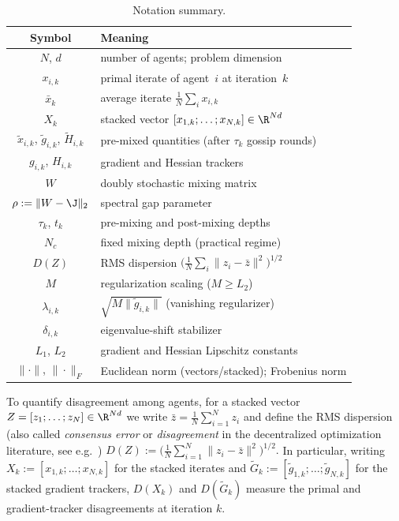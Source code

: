 \documentclass[review,onefignum,onetabnum]{siamart171218}
\begin{document}
	\begin{table}[htbp]
		\centering
		\caption{Notation summary.}
		\label{tab:notation}
		\setlength{\tabcolsep}{4pt}
		\small
		\begin{tabular}{cl}
			\toprule
			Symbol & Meaning \\
			\midrule
			$N$, $d$ & number of agents; problem dimension \\
			$x_{i,k}$ & primal iterate of agent~$i$ at iteration~$k$ \\
			$\bar x_k$ & average iterate $\frac1N\sum_i x_{i,k}$ \\
			$X_k$ & stacked vector $[x_{1,k};\dots;x_{N,k}]\in\R^{Nd}$ \\
			$\tilde x_{i,k}$, $\tilde g_{i,k}$, $\tilde H_{i,k}$ & pre-mixed quantities (after $\tau_k$ gossip rounds) \\
			$g_{i,k}$, $H_{i,k}$ & gradient and Hessian trackers \\
			$W$ & doubly stochastic mixing matrix \\
			$\rho:=\|W-\J\|_2$ & spectral gap parameter \\
			$\tau_k$, $t_k$ & pre-mixing and post-mixing depths \\
			$N_c$ & fixed mixing depth (practical regime) \\
			$D(Z)$ & RMS dispersion $\bigl(\frac1N\sum_i\|z_i-\bar z\|^2\bigr)^{1/2}$ \\
			$M$ & regularization scaling ($M\ge L_2$) \\
			$\lambda_{i,k}$ & $\sqrt{M\|\tilde g_{i,k}\|}$ (vanishing regularizer) \\
			$\delta_{i,k}$ & eigenvalue-shift stabilizer \\
			$L_1$, $L_2$ & gradient and Hessian Lipschitz constants \\
			$\|\cdot\|$, $\|\cdot\|_F$ & Euclidean norm (vectors/stacked); Frobenius norm \\
			\bottomrule
		\end{tabular}
	\end{table}
	
	To quantify disagreement among agents, for a stacked vector $Z=[z_1;\dots;z_N]\in\R^{Nd}$
	we write $\bar z=\frac1N\sum_{i=1}^N z_i$ and define the RMS dispersion
	(also called \emph{consensus error} or \emph{disagreement} in the
	decentralized optimization literature, see e.g.\
	\citet{nedic2009subgradient,nedic2017diging})
	\(
	  D(Z):=\bigl(\tfrac1N\sum_{i=1}^N\|z_i-\bar z\|^2\bigr)^{1/2}.
	\)
	In particular, writing $X_k:=[x_{1,k};\dots;x_{N,k}]$ for the stacked iterates and
	$\tilde G_k:=[\tilde g_{1,k};\dots;\tilde g_{N,k}]$ for the stacked gradient trackers,
	$D(X_k)$ and $D(\tilde G_k)$ measure the primal and gradient-tracker disagreements at iteration $k$.
\end{document}
